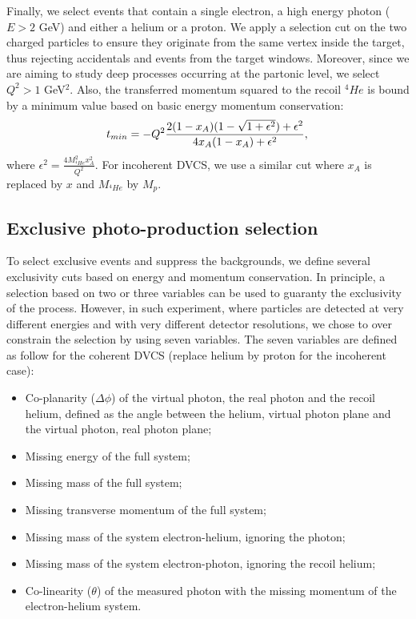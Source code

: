 \documentclass[aps,prc,preprint,superscriptaddress]{revtex4}
\begin{document}
Finally, we select events that contain a single electron, a high energy photon ($E>2$ GeV) and
either a helium or a proton. We apply a selection cut on the two charged particles 
to ensure they originate from the same vertex inside the target, thus rejecting accidentals and
events from the target windows.
Moreover, since we are aiming to study deep processes occurring at the partonic level, we select
$Q^2>1$ GeV$^2$. Also, the transferred momentum squared to the recoil $^{4}He$ is bound by
   a minimum value based on basic energy momentum conservation:
\begin{equation}
   t_{min} = - Q^{2} \frac{2(1- x_{A})(1 - \sqrt{1 + \epsilon ^{2}}) + \epsilon 
   ^{2}}{4 x_{A}(1-x_{A})+ \epsilon ^{2}},\\
\end{equation}
where $\epsilon ^{2} = \frac{4M^{2}_{^4\!He}x^{2}_{A}}{Q^{2}}$. For incoherent DVCS, 
we use a similar cut where $x_A$ is replaced by $x$ and $M_{^4\!He}$ by $M_{p}$. 

\subsection{Exclusive photo-production selection}

To select exclusive events and suppress the backgrounds, we define several 
exclusivity cuts based on energy and momentum conservation. In principle, 
a selection based on two or three variables can be used to guaranty the 
exclusivity of the process. However, in such experiment, where particles 
are detected at very different energies and with very different detector 
resolutions, we chose to over constrain the selection by using seven 
variables. The seven variables are defined as follow for the coherent 
DVCS (replace helium by proton for the incoherent case):
\begin{itemize}
	\item Co-planarity ($\Delta \phi$) of the virtual photon, the real photon and
		the recoil helium, defined as the angle between the helium, virtual photon
		plane and the virtual photon, real photon plane;
	\item Missing energy of the full system;
	\item Missing mass of the full system;
	\item Missing transverse momentum of the full system;
	\item Missing mass of the system electron-helium, ignoring the photon;
	\item Missing mass of the system electron-photon, ignoring the recoil helium;
	\item Co-linearity ($\theta$) of the measured photon with the missing momentum of the 
		electron-helium system.
\end{itemize}
\end{document}
